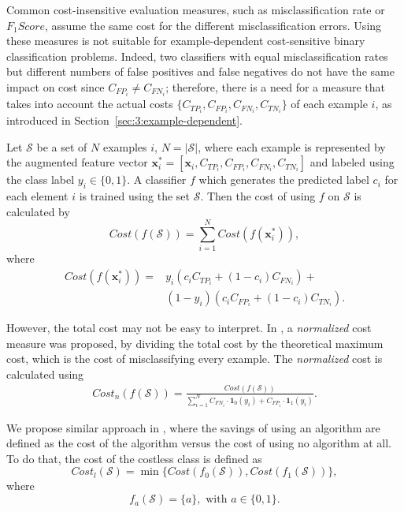 {{  Common cost-insensitive evaluation measures, such as misclassification rate or \mbox{$F_1Score$}, 
  assume the same cost for the different misclassification errors. Using these measures is not 
  suitable for example-dependent cost-sensitive binary classification problems. Indeed, two 
  classifiers with equal misclassification rates but different numbers of false positives and 
  false negatives do not have the same impact on cost since \mbox{$C_{FP_i}\ne C_{FN_i}$};
  therefore, there is a need for a measure that takes into account the actual costs 
  $\{C_{TP_i},C_{FP_i},C_{FN_i},C_{TN_i}\}$ of each example $i$, as introduced in 
  Section~\ref{sec:3:example-dependent}.
  
  Let $\mathcal{S}$ be a set of $N$ examples $i$, $N=\vert \mathcal{S} \vert$, where each example 
  is represented by  the augmented feature vector $\mathbf{x}_i^*=[\mathbf{x}_i, 
  C_{TP_i},C_{FP_i},C_{FN_i},C_{TN_i}]$  and labeled using the class   label $y_i   \in \{0,1\}$. 
  A classifier $f$ which generates the   predicted label $c_i$ for each   element $i$ is trained  
  using the set $\mathcal{S}$. Then the cost of   using $f$ on $\mathcal{S}$ is calculated by
  \begin{equation}\label{eq:3:cost_total}
     Cost(f(\mathcal{S})) = \sum_{i=1}^N Cost(f(\mathbf{x}_i^*)),
  \end{equation}
  where
   \begin{align}\label{eq:3:cost}
    Cost(f(\mathbf{x}_i^*)) =& y_i(c_i C_{TP_i} + (1-c_i)C_{FN_i}) + \nonumber \\  
    & (1-y_i)(c_i C_{FP_i} + (1-c_i)C_{TN_i}).
  \end{align}

  However, the total cost may not be easy to interpret. In \citep{Whitrow2008}, a 
  \textit{normalized} cost measure was proposed, by dividing the total cost by the theoretical 
  maximum cost, which is the cost of misclassifying every example. The \textit{normalized} cost is 
  calculated using
  \begin{align}\label{eq:3:ncost}
    Cost_n(f(\mathcal{S})) = \frac{Cost(f(\mathcal{S}))}
    {\sum_{i=1}^N C_{FN_i} \cdot \mathbf{1}_0(y_i) 
    +  C_{FP_i} \cdot \mathbf{1}_1(y_i)  }.
  \end{align} 

  We propose similar approach in \citep{CorreaBahnsen2014b}, where the savings of using an 
  algorithm  are defined as the cost of the algorithm versus the cost of using no algorithm at all. 
  To do that, the cost of the costless class is defined as 
  \begin{equation}
    Cost_l(\mathcal{S}) = \min \{Cost(f_0(\mathcal{S})), Cost(f_1(\mathcal{S}))\},
  \end{equation}
  where 
  \begin{equation}\label{eq:3:f_a}
    f_a(\mathcal{S}) = \{a\}, \text{ with } a\in \{0,1\}.
  \end{equation}

}}
